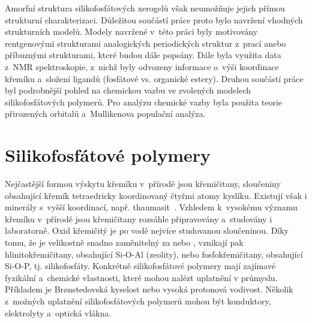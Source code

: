 \documentclass[
digital, %
table,   %
nolof,     %
nolot,     %
oneside,
]{fithesis3}
\begin{document}
Amorfní struktura silikofosfátových xerogelů však neumožňuje jejich přímou strukturní charakterizaci. Důležitou součástí práce proto bylo navržení vhodných strukturních modelů. Modely navržené v~této práci byly motivovány rentgenovými strukturami analogických periodických struktur z~prací \cite{C3NJ00721A, rtg_4_pinkas} anebo příbuznými strukturami, které budou dále popsány. Dále byla využita data z~NMR spektroskopie, z~nichž byly odvozeny informace o~výši koordinace křemíku a~složení ligandů (fosfátové vs. organické estery)\cite{Styskalik2015thesis}. Druhou součástí práce byl podrobnější pohled na chemickou vazbu ve zvolených modelech silikofosfátových polymerů. Pro analýzu chemické vazby byla použita teorie přirozených orbitalů a~Mullikenova populační analýza.

\section{Silikofosfátové polymery}
Nejčastější formou výskytu křemíku v~přírodě jsou křemičitany, sloučeniny obsahující křemík tetraedricky koordinovaný čtyřmi atomy kyslíku. Existují však i minerály s~vyšší koordinací, např. thaumasit~\cite{Edge:a08100}. Vzhledem k~vysokému významu křemíku v~přírodě jsou křemičitany rozsáhle připravovány a~studovány i laboratorně. Oxid křemičitý  je po vodě nejvíce studovanou sloučeninou. Díky tomu, že  je velikostně snadno zaměnitelný za  nebo , vznikají pak hlinitokřemičitany, obsahující Si-O-Al (zeolity), nebo fosfokřemičitany, obsahující Si-O-P, tj. silikofosfáty. Konkrétně silikofosfátové polymery mají zajímavé fyzikální a~chemické vlastnosti, které mohou nalézt uplatnění v průmyslu. Příkladem je Brønstedovská kyselost nebo vysoká protonová vodivost. Několik z~možných uplatnění silikofosfátových polymerů mohou být konduktory, elektrolyty  a~optická vlákna.
\end{document}

